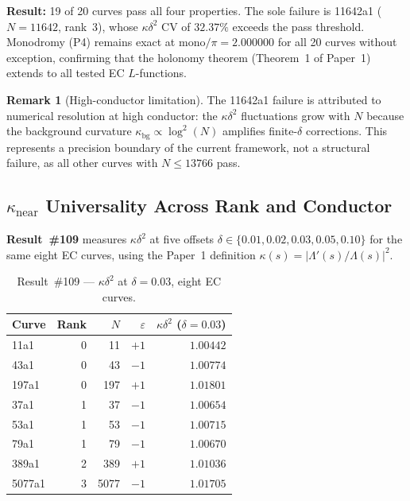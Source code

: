 \documentclass[11pt, a4paper]{article}
\theoremstyle{plain}
\theoremstyle{definition}
\newtheorem{remark}{Remark}[section]
\begin{document}
\textbf{Result:} 19 of 20 curves pass all four properties.
The sole failure is 11642a1 ($N=11642$, rank~3), whose
$\kappa\delta^{2}$ CV of $32.37\%$ exceeds the pass threshold.
Monodromy (P4) remains exact at $\mathrm{mono}/\pi = 2.000000$
for all 20 curves without exception, confirming that the holonomy
theorem (Theorem~1 of Paper~1) extends to all tested EC $L$-functions.

\begin{remark}[High-conductor limitation]
\label{rem:highcond}
The 11642a1 failure is attributed to numerical resolution at high
conductor: the $\kappa\delta^{2}$ fluctuations grow with $N$ because
the background curvature $\kappa_{\mathrm{bg}} \propto \log^{2}(N)$
amplifies finite-$\delta$ corrections.  This represents a precision
boundary of the current framework, not a structural failure, as all
other curves with $N \leq 13766$ pass.
\end{remark}


\subsection{$\kappa_{\mathrm{near}}$ Universality Across Rank and Conductor}
\label{ssec:thm5}

\textbf{Result~\#109} measures $\kappa\delta^{2}$ at five offsets
$\delta\in\{0.01,0.02,0.03,0.05,0.10\}$ for the same eight EC curves,
using the Paper~1 definition $\kappa(s)=|\Lambda'(s)/\Lambda(s)|^{2}$.

\begin{table}[ht]
\centering
\caption{Result~\#109 — $\kappa\delta^{2}$ at $\delta=0.03$, eight EC curves.}
\label{tab:ec109}
\small
\begin{tabular}{lrrrr}
\toprule
Curve & Rank & $N$ & $\varepsilon$ & $\kappa\delta^{2}$ ($\delta=0.03$) \\
\midrule
11a1   & 0 & 11    & $+1$ & $1.00442$ \\
43a1   & 0 & 43    & $-1$ & $1.00774$ \\
197a1  & 0 & 197   & $+1$ & $1.01801$ \\
37a1   & 1 & 37    & $-1$ & $1.00654$ \\
53a1   & 1 & 53    & $-1$ & $1.00715$ \\
79a1   & 1 & 79    & $-1$ & $1.00670$ \\
389a1  & 2 & 389   & $+1$ & $1.01036$ \\
5077a1 & 3 & 5077  & $-1$ & $1.01705$ \\
\bottomrule
\end{tabular}
\end{table}
\end{document}
